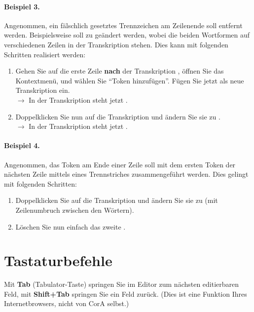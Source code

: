 \documentclass[11pt,a4paper,parskip=half]{scrartcl}
\begin{document}
\paragraph{Beispiel 3.}  Angenommen, ein fälschlich gesetztes
Trennzeichen am Zeilenende soll entfernt werden.  Beispielsweise soll
 zu  geändert werden, wobei die beiden
Wortformen auf verschiedenen Zeilen in der Transkription stehen.  Dies
kann mit folgenden Schritten realisiert werden:
\begin{enumerate}
\item Gehen Sie auf die erste Zeile \textbf{nach} der Transkription
  , öffnen Sie das Kontextmenü, und wählen Sie
  "`Token hinzufügen"'.  Fügen Sie jetzt  als neue
  Transkription ein.\\$\to$ In der Transkription steht jetzt
  .
\item Doppelklicken Sie nun auf die Transkription 
  und ändern Sie sie zu .\\$\to$ In der Transkription steht
  jetzt .
\end{enumerate}

\paragraph{Beispiel 4.}  Angenommen, das Token  am Ende
einer Zeile soll mit dem ersten Token  der nächsten Zeile
mittels eines Trennstriches \trans{(=)} zusammengeführt werden.  Dies
gelingt mit folgenden Schritten:
\begin{enumerate}
\item Doppelklicken Sie auf die Transkription  und ändern Sie sie zu
   (mit Zeilenumbruch zwischen den Wörtern).
\item Löschen Sie nun einfach das zweite .
\end{enumerate}

\vspace{2em} %
\section{Tastaturbefehle}

Mit \textbf{Tab} (Tabulator-Taste) springen Sie im Editor zum nächsten
editierbaren Feld, mit \textbf{Shift+Tab} springen Sie ein Feld
zurück.  (Dies ist eine Funktion Ihres Internetbrowsers, nicht von
CorA selbst.)
\end{document}
